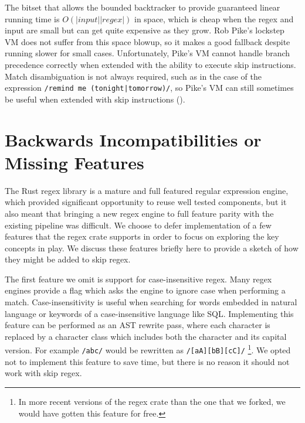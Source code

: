 The bitset that allows the bounded backtracker to provide guaranteed
linear running time is $O(|input||regex|)$ in space, which is
cheap when the regex and input are small but can get quite expensive
as they grow. Rob Pike's lockstep VM does not suffer from this
space blowup, so it makes a good fallback despite running slower
for small cases. Unfortunately, Pike's VM cannot handle branch
precedence correctly when extended with the ability to execute
skip instructions. Match disambiguation is not always required,
such as in the case of the expression
\verb'/remind me (tonight|tomorrow)/',
so Pike's VM can still sometimes be useful when extended with
skip instructions (\cite{Pike1987}).

\section{Backwards Incompatibilities or Missing Features}

The Rust regex library is a mature and full featured regular expression
engine, which provided significant opportunity to reuse well tested
components, but it also meant that bringing a new regex engine to
full feature parity with the existing pipeline was difficult. We
choose to defer implementation of a few features that the regex crate
supports in order to focus on exploring the key concepts in play.
We discuss these features briefly here to provide a sketch of how
they might be added to skip regex.

The first feature we omit is support for case-insensitive regex.
Many regex engines provide a flag which asks the engine to ignore
case when performing a match. Case-insensitivity is useful when searching
for words embedded in natural language or keywords of a case-insensitive
language like SQL. Implementing this feature can be performed as
an AST rewrite pass, where each character is replaced by a character
class which includes both the character and its capital version.
For example \verb'/abc/' would be rewritten as \verb'/[aA][bB][cC]/'
\footnote{In more recent versions of the regex crate than the one
that we forked, we would have gotten this feature for free.}.
We opted not to implement this feature to save time,
but there is no reason it should not work with skip regex.


